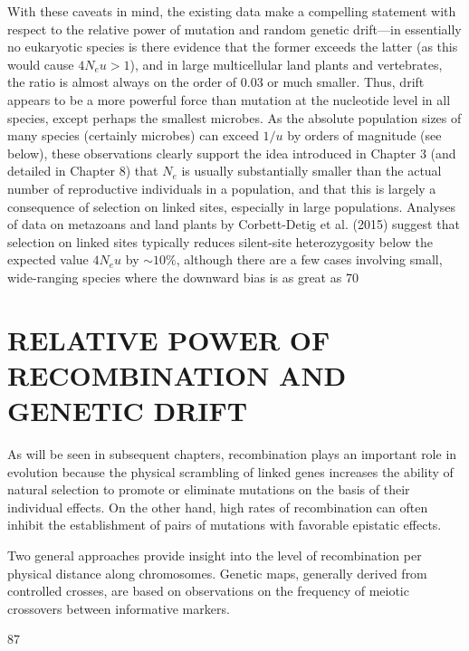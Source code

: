 \documentclass{article}
\begin{document}
With these caveats in mind, the existing data make a compelling statement with respect to the relative power of mutation and random genetic drift—in essentially no eukaryotic species is there evidence that the former exceeds the latter (as this would cause  $ 4N_{e}u > 1 $), and in large multicellular land plants and vertebrates, the ratio is almost always on the order of 0.03 or much smaller. Thus, drift appears to be a more powerful force than mutation at the nucleotide level in all species, except perhaps the smallest microbes. As the absolute population sizes of many species (certainly microbes) can exceed  $ 1/u $ by orders of magnitude (see below), these observations clearly support the idea introduced in Chapter 3 (and detailed in Chapter 8) that  $ N_{e} $ is usually substantially smaller than the actual number of reproductive individuals in a population, and that this is largely a consequence of selection on linked sites, especially in large populations. Analyses of data on metazoans and land plants by Corbett-Detig et al. (2015) suggest that selection on linked sites typically reduces silent-site heterozygosity below the expected value  $ 4N_{e}u $ by  $ \sim10\% $, although there are a few cases involving small, wide-ranging species where the downward bias is as great as 70%

\section{RELATIVE POWER OF RECOMBINATION AND GENETIC DRIFT}
As will be seen in subsequent chapters, recombination plays an important role in evolution because the physical scrambling of linked genes increases the ability of natural selection to promote or eliminate mutations on the basis of their individual effects. On the other hand, high rates of recombination can often inhibit the establishment of pairs of mutations with favorable epistatic effects.

Two general approaches provide insight into the level of recombination per physical distance along chromosomes. Genetic maps, generally derived from controlled crosses, are based on observations on the frequency of meiotic crossovers between informative markers.

87
\end{document}
